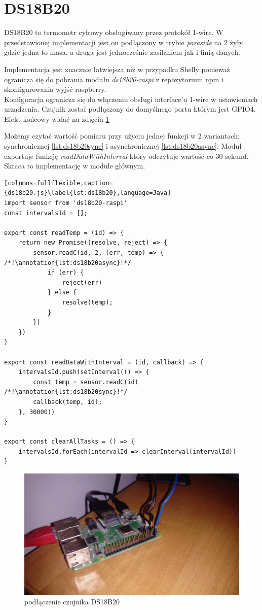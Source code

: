 \section{DS18B20}
DS18B20 to termometr cyfrowy obsługiwany przez protokół 1-wire. W przedstawionej implementacji jest on podłączony w trybie \textit{paraside} na 2 żyły gdzie jedna to masa, a druga jest jednocześnie zasilaniem jak i linią danych. 
\par Implementacja jest znacznie łatwiejsza niż w przypadku Shelly ponieważ ogranicza się do pobrania modułu \textit{ds18b20-raspi} z repozytorium npm i skonfigurowania wyjść raspberry. \\
Konfiguracja ogranicza się do włączeniu obsługi interface'u 1-wire w ustawieniach urządzenia. Czujnik został podłączony do domyślnego portu którym jest GPIO4. Efekt końcowy widać na zdjęciu \ref{fig:finalGPIOConnections} \cite{linux}
\par Możemy czytać wartość pomiaru przy użyciu jednej funkcji w 2 wariantach: synchronicznej \ref{lst:ds18b20sync} i asynchronicznej \ref{lst:ds18b20async}. Moduł exportuje funkcję \textit{readDataWithInterval} który odczytuje wartość co 30 sekund. Skraca to implementację w module głównym.
\newpage
\begin{lstlisting}[columns=fullflexible,caption={ds18b20.js}\label{lst:ds18b20},language=Java]
import sensor from 'ds18b20-raspi'
const intervalsId = [];

export const readTemp = (id) => {
    return new Promise((resolve, reject) => {
        sensor.readC(id, 2, (err, temp) => { /*!\annotation{lst:ds18b20async}!*/
            if (err) {
                reject(err)
            } else {
                resolve(temp);
            }
        })
    })
}

export const readDataWithInterval = (id, callback) => {
    intervalsId.push(setInterval(() => {
        const temp = sensor.readC(id) /*!\annotation{lst:ds18b20sync}!*/
        callback(temp, id);
    }, 30000))
}

export const clearAllTasks = () => {
    intervalsId.forEach(intervalId => clearInterval(intervalId))
}
\end{lstlisting}
\begin{figure}[h]
  \includegraphics[width=\linewidth]{gpio.jpg}
  \caption{podłączenie czujnika DS18B20}
  \label{fig:finalGPIOConnections}
\end{figure}